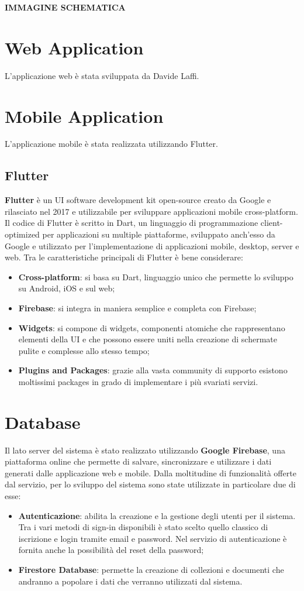 \documentclass[12pt,a4paper,twoside,openright,titlepage]{book}
\begin{document}
\textbf{IMMAGINE SCHEMATICA}

\section{Web Application}
L'applicazione web è stata sviluppata da Davide Laffi.

\section{Mobile Application}
L'applicazione mobile è stata realizzata utilizzando Flutter.

\subsection{Flutter}
\textbf{Flutter} è un UI software development kit open-source creato da Google e rilasciato nel 2017 e utilizzabile per sviluppare applicazioni mobile cross-platform. Il codice di Flutter è scritto in Dart, un linguaggio di programmazione client-optimized per applicazioni su multiple piattaforme, sviluppato anch'esso da Google e utilizzato per l'implementazione di applicazioni mobile, desktop, server e web. Tra le caratteristiche principali di Flutter è bene considerare:
\begin{itemize}
\item \textbf{Cross-platform}: si basa su Dart, linguaggio unico che permette lo sviluppo su Android, iOS e sul web;
\item \textbf{Firebase}: si integra in maniera semplice e completa con Firebase;
\item \textbf{Widgets}: si compone di widgets, componenti atomiche che rappresentano elementi della UI e che possono essere uniti nella creazione di schermate pulite e complesse allo stesso tempo; 
\item \textbf{Plugins and Packages}: grazie alla vasta community di supporto esistono moltissimi packages in grado di implementare i più svariati servizi.
\end{itemize}

\section{Database}
Il lato server del sistema è stato realizzato utilizzando \textbf{Google Firebase}, una piattaforma online che permette di salvare, sincronizzare e utilizzare i dati generati dalle applicazione web e mobile. Dalla moltitudine di funzionalità offerte dal servizio, per lo sviluppo del sistema sono state utilizzate in particolare due di esse:
\begin{itemize}
\item \textbf{Autenticazione}: abilita la creazione e la gestione degli utenti per il sistema. Tra i vari metodi di sign-in disponibili è stato scelto quello classico di iscrizione e login tramite email e password. Nel servizio di autenticazione è fornita anche la possibilità del reset della password;
\item \textbf{Firestore Database}: permette la creazione di collezioni e documenti che andranno a popolare i dati che verranno utilizzati dal sistema.
\end{itemize}
\end{document}
